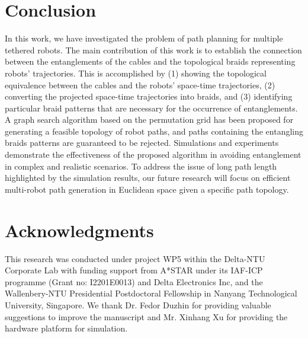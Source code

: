 \documentclass[conference]{IEEEtran}
\begin{document}
\section{Conclusion} 
\label{sec:conclusion}
In this work, we have investigated the problem of path planning for multiple tethered robots.
The main contribution of this work is to establish the connection between the entanglements of the cables and the topological braids representing robots' trajectories.
This is accomplished by (1) showing the topological equivalence between the cables and the robots' space-time trajectories, (2) converting the projected space-time trajectories into braids, and (3) identifying particular braid patterns that are necessary for the occurrence of entanglements.
A graph search algorithm based on the permutation grid has been proposed for generating a feasible topology of robot paths,
and paths containing the entangling braids patterns are guaranteed to be rejected.
Simulations and experiments demonstrate the effectiveness of the proposed algorithm in avoiding entanglement in complex and realistic scenarios.
To address the issue of long path length highlighted by the simulation results,  
our future research will focus on efficient multi-robot path generation in Euclidean space given a specific path topology.
 \section*{Acknowledgments}
 This research was conducted under project WP5 within the Delta-NTU Corporate Lab with funding support from A*STAR under its IAF-ICP programme (Grant no: I2201E0013) and Delta Electronics Inc, and the Wallenbery-NTU Presidential Postdoctoral Fellowship in Nanyang Technological University, Singapore.
 We thank Dr. Fedor Duzhin for providing valuable suggestions to improve the manuscript and Mr. Xinhang Xu for providing the hardware platform for simulation.
\end{document}

